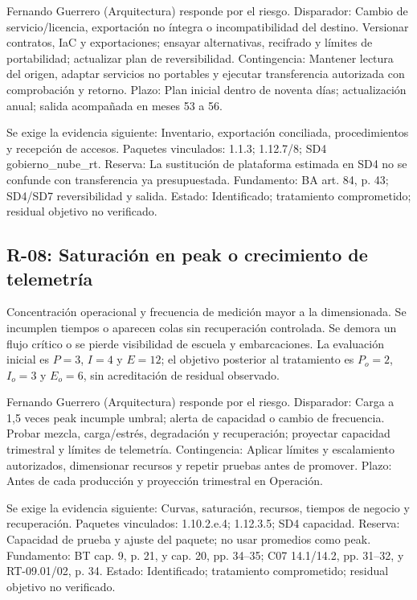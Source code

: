Fernando Guerrero (Arquitectura) responde por el riesgo. Disparador: Cambio de servicio/licencia, exportación no íntegra o incompatibilidad del destino. Versionar contratos, IaC y exportaciones; ensayar alternativas, recifrado y límites de portabilidad; actualizar plan de reversibilidad. Contingencia: Mantener lectura del origen, adaptar servicios no portables y ejecutar transferencia autorizada con comprobación y retorno. Plazo: Plan inicial dentro de noventa días; actualización anual; salida acompañada en meses 53 a 56.

Se exige la evidencia siguiente: Inventario, exportación conciliada, procedimientos y recepción de accesos. Paquetes vinculados: 1.1.3; 1.12.7/8; SD4 gobierno\_nube\_rt. Reserva: La sustitución de plataforma estimada en SD4 no se confunde con transferencia ya presupuestada. Fundamento: BA art. 84, p. 43; SD4/SD7 reversibilidad y salida. Estado: Identificado; tratamiento comprometido; residual objetivo no verificado. \parencite[art.~84, p.~43]{sd8-ba}

\subsection{R-08: Saturación en peak o crecimiento de telemetría}
Concentración operacional y frecuencia de medición mayor a la dimensionada. Se incumplen tiempos o aparecen colas sin recuperación controlada. Se demora un flujo crítico o se pierde visibilidad de escuela y embarcaciones. La evaluación inicial es $P=3$, $I=4$ y $E=12$; el objetivo posterior al tratamiento es $P_o=2$, $I_o=3$ y $E_o=6$, sin acreditación de residual observado.

Fernando Guerrero (Arquitectura) responde por el riesgo. Disparador: Carga a 1,5 veces peak incumple umbral; alerta de capacidad o cambio de frecuencia. Probar mezcla, carga/estrés, degradación y recuperación; proyectar capacidad trimestral y límites de telemetría. Contingencia: Aplicar límites y escalamiento autorizados, dimensionar recursos y repetir pruebas antes de promover. Plazo: Antes de cada producción y proyección trimestral en Operación.

Se exige la evidencia siguiente: Curvas, saturación, recursos, tiempos de negocio y recuperación. Paquetes vinculados: 1.10.2.e.4; 1.12.3.5; SD4 capacidad. Reserva: Capacidad de prueba y ajuste del paquete; no usar promedios como peak. Fundamento: BT cap. 9, p. 21, y cap. 20, pp. 34–35; C07 14.1/14.2, pp. 31–32, y RT-09.01/02, p. 34. Estado: Identificado; tratamiento comprometido; residual objetivo no verificado. \parencites[cap.~9, p.~21; cap.~20, pp.~34--35]{sd8-bt}[numerales 14.1/14.2, pp.~31--32; RT-09.01/02, p.~34]{sd8-c07}

